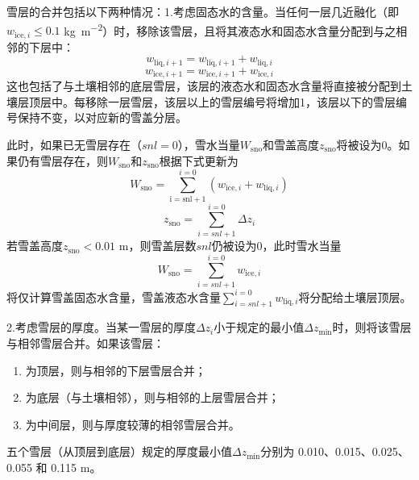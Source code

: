 雪层的合并包括以下两种情况：1.考虑固态水的含量。当任何一层几近融化（即$w_{\mathrm{ice},i} \leqslant 0.1$ \unit{kg.m^{-2}}）时，移除该雪层，且将其液态水和固态水含量分配到与之相邻的下层中：
\begin{equation}
  w_{\mathrm{liq},i+1} = w_{\mathrm{liq},i+1} + w_{\mathrm{liq},i}
\end{equation}
\begin{equation}
  w_{\mathrm{ice},i+1} = w_{\mathrm{ice},i+1} + w_{\mathrm{ice},i}
\end{equation}
这也包括了与土壤相邻的底层雪层，该层的液态水和固态水含量将直接被分配到土壤层顶层中。每移除一层雪层，该层以上的雪层编号将增加1，该层以下的雪层编号保持不变，以对应新的雪盖分层。

此时，如果已无雪层存在（$snl=0$），雪水当量$W_{\mathrm{sno}}$和雪盖高度$z_{\mathrm{sno}}$将被设为0。如果仍有雪层存在，则$W_{\mathrm{sno}}$和$z_{\mathrm{sno}}$根据下式更新为
\begin{equation}
  W_{\mathrm{sno}} = \sum_{\mathrm{i=snl+1}}^{i=0}\left(w_{\mathrm{ice},i}+w_{\mathrm{liq},i}\right)
\end{equation}
\begin{equation}
  z_{\mathrm{sno}} = \sum_{i=snl+1}^{i=0} \Delta z_i
\end{equation}
若雪盖高度$z_{\mathrm{sno}} < 0.01$ \unit{m}，则雪盖层数$snl$仍被设为0，此时雪水当量
$$W_{\mathrm{sno}}=\sum_{i=snl+1}^{i=0} w_{\mathrm{ice},i}$$
将仅计算雪盖固态水含量，雪盖液态水含量$\sum_{i=snl+1}^{i=0} w_{\mathrm{liq},i}$将分配给土壤层顶层。

2.考虑雪层的厚度。当某一雪层的厚度$\Delta z_i$小于规定的最小值$\Delta z_{\mathrm{min}}$时，则将该雪层与相邻雪层合并。如果该雪层：
\begin{enumerate}
  \item 为顶层，则与相邻的下层雪层合并；
  \item 为底层（与土壤相邻），则与相邻的上层雪层合并；
  \item 为中间层，则与厚度较薄的相邻雪层合并。
\end{enumerate}

五个雪层（从顶层到底层）规定的厚度最小值$\Delta z_{\mathrm{min}}$分别为 0.010、0.015、0.025、0.055 和 0.115 \unit{m}。

